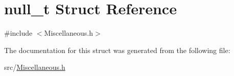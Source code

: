 \hypertarget{structnull__t}{}\section{null\+\_\+t Struct Reference}
\label{structnull__t}


{\ttfamily \#include $<$Miscellaneous.\+h$>$}



The documentation for this struct was generated from the following file\+:\begin{DoxyCompactItemize}
\item 
src/\hyperlink{_miscellaneous_8h}{Miscellaneous.\+h}\end{DoxyCompactItemize}
